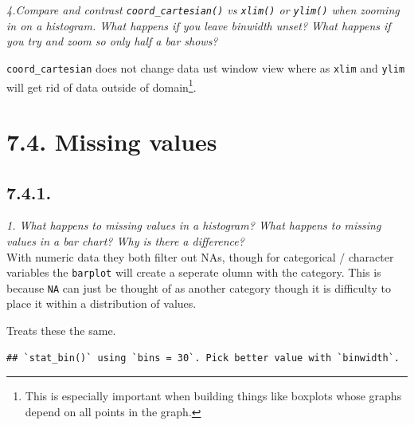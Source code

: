 \documentclass[]{book}
\newenvironment{Shaded}{\begin{snugshade}}{\end{snugshade}}
\newcommand{\DataTypeTok}[1]{\textcolor[rgb]{0.13,0.29,0.53}{#1}}
\newcommand{\DecValTok}[1]{\textcolor[rgb]{0.00,0.00,0.81}{#1}}
\newcommand{\FloatTok}[1]{\textcolor[rgb]{0.00,0.00,0.81}{#1}}
\newcommand{\KeywordTok}[1]{\textcolor[rgb]{0.13,0.29,0.53}{\textbf{#1}}}
\newcommand{\NormalTok}[1]{#1}
\newcommand{\OperatorTok}[1]{\textcolor[rgb]{0.81,0.36,0.00}{\textbf{#1}}}
\newcommand{\OtherTok}[1]{\textcolor[rgb]{0.56,0.35,0.01}{#1}}
\newcommand{\StringTok}[1]{\textcolor[rgb]{0.31,0.60,0.02}{#1}}
\let\rmarkdownfootnote\footnote%
\def\footnote{\protect\rmarkdownfootnote}
\theoremstyle{definition}
\theoremstyle{definition}
\theoremstyle{definition}
\theoremstyle{remark}
\begin{document}
\emph{4.Compare and contrast \texttt{coord\_cartesian()} vs
\texttt{xlim()} or \texttt{ylim()} when zooming in on a histogram. What
happens if you leave binwidth unset? What happens if you try and zoom so
only half a bar shows?}

\texttt{coord\_cartesian} does not change data ust window view where as
\texttt{xlim} and \texttt{ylim} will get rid of data outside of
domain\footnote{This is especially important when building things like
  boxplots whose graphs depend on all points in the graph.}.

\hypertarget{missing-values}{%
\section{7.4. Missing values}\label{missing-values}}

\hypertarget{section-22}{%
\subsection{7.4.1.}\label{section-22}}

\emph{1. What happens to missing values in a histogram? What happens to
missing values in a bar chart? Why is there a difference?}\\
With numeric data they both filter out NAs, though for categorical /
character variables the \texttt{barplot} will create a seperate olumn
with the category. This is because \texttt{NA} can just be thought of as
another category though it is difficulty to place it within a
distribution of values.

Treats these the same.

\begin{Shaded}
\end{Shaded}

\begin{verbatim}
## `stat_bin()` using `bins = 30`. Pick better value with `binwidth`.
\end{verbatim}
\end{document}
